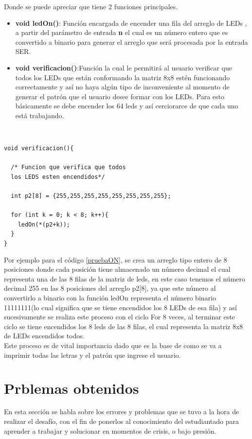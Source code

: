 \documentclass{article}
\begin{document}
Donde se puede apreciar que tiene 2 funciones principales.

\begin{itemize}
    \item \textbf{ void ledOn()}: Función encargada de encender una fila del arreglo de LEDs , a partir del parámetro de entrada \textbf{n} el cual es un número entero que es convertido a binario para generar el arreglo que será procesada por la entrada SER.
    \item \textbf{void verificacion()}:Función la cual le permitirá al usuario verificar que todos los LEDs que están conformando la matriz 8x8 estén funcionando correctamente  y así no haya algún tipo de inconveniente al momento de generar el patrón que el usuario desee formar con los LEDs. Para esto básicamente se debe encender los 64 leds y así cerciorarce de que  cada uno está trabajando.
    
\end{itemize}
\\

\begin{lstlisting}[language=arduino, label=pruebaON]
void verificacion(){ 
  
  /* Funcion que verifica que todos 
  los LEDS esten encendidos*/
  
  int p2[8] = {255,255,255,255,255,255,255,255};
  
  for (int k = 0; k < 8; k++){
    ledOn(*(p2+k));
  }
}
\end{lstlisting}

Por ejemplo para el código \ref{pruebaON}, se crea un arreglo tipo entero de 8 posiciones donde cada posición tiene almacenado un número decimal el cual representa una de las 8 filas de la matriz de leds, en este caso tenemos el número decimal 255 en las 8 posiciones del arreglo p2[8], ya que este número al convertirlo a binario con la función ledOn  representa el número binario 11111111(lo cual significa que se tiene encendidos los 8 LEDs de esa fila) y así sucesivamente se realiza este proceso con el ciclo For 8 veces, al  terminar este ciclo se tiene encendidos los 8 leds de las 8 filas, el cual representa la matriz 8x8 de LEDs encendidos todos.\\

Este proceso es de vital importancia dado que es la base de como se va a imprimir todas las letras y el patrón que ingrese el usuario.

\section{Prblemas obtenidos}\label{problem}
En esta sección se habla sobre los errores y problemas que se tuvo a la hora de realizar el desafío, con el fin de ponerlos al conocimiento del estudiantado para aprender a trabajar y solucionar en momentos de crisis, o bajo presión.
\end{document}
